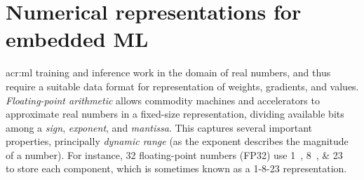 %



\section{Numerical representations for embedded ML}\label{sec:numerical-representations-for-embedded-ml}
\gls{acr:ml} training and inference work in the domain of real numbers, and thus require a suitable data format for representation of weights, gradients, and values.
\emph{Floating-point arithmetic} allows commodity machines and accelerators to approximate real numbers in a fixed-size representation, dividing available bits among a \emph{sign}, \emph{exponent}, and \emph{mantissa}.
This captures several important properties, principally \emph{dynamic range} (as the exponent describes the magnitude of a number).
For instance, \qty{32}{\bit} floating-point numbers (FP32) use \qtylist{1; 8; 23}{\bit} to store each component, which is sometimes known as a 1-8-23 representation.


